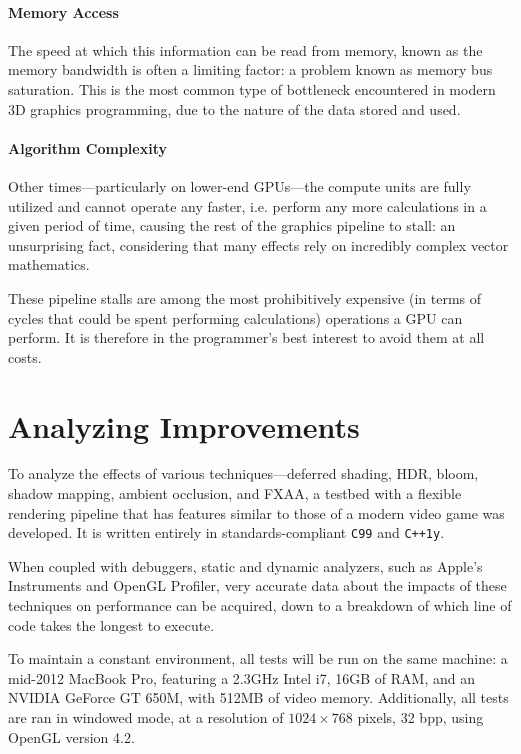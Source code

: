 \documentclass[11pt, oneside]{report}
\begin{document}
\paragraph{Memory Access}
The speed at which this information can be read from memory, known as the \gls{memory bandwidth} is often a limiting factor: a problem known as memory bus saturation. This is the most common type of bottleneck encountered in modern 3D graphics programming, due to the nature of the data stored and used.

\paragraph{Algorithm Complexity}
Other times---particularly on lower-end \glspl{GPU}---the \glspl{compute unit} are fully utilized and cannot operate any faster, i.e. perform any more calculations in a given period of time, causing the rest of the \gls{graphics pipeline} to stall: an unsurprising fact, considering that many effects rely on incredibly complex vector mathematics.

These pipeline stalls are among the most prohibitively expensive (in terms of cycles that could be spent performing calculations) operations a \gls{GPU} can perform. It is therefore in the programmer's best interest to avoid them at all costs.

\section{Analyzing Improvements}
To analyze the effects of various techniques—\gls{deferred shading}, \gls{HDR}, \gls{bloom}, \gls{shadow mapping}, \gls{ambient occlusion}, and \gls{FXAA}, a testbed with a flexible rendering pipeline that has features similar to those of a modern video game was developed. It is written entirely in standards-compliant \texttt{C99} and \texttt{C++1y}.

When coupled with debuggers, static and dynamic analyzers, such as Apple's Instruments and \gls{OpenGL} Profiler, very accurate data about the impacts of these techniques on performance can be acquired, down to a breakdown of which line of code takes the longest to execute.

To maintain a constant environment, all tests will be run on the same machine: a mid-2012 MacBook Pro, featuring a 2.3GHz Intel i7, 16GB of RAM, and an NVIDIA GeForce GT 650M, with 512MB of video memory. Additionally, all tests are ran in windowed mode, at a resolution of $1024 \times 768$ pixels, 32 \gls{bpp}, using \gls{OpenGL} version 4.2.
\end{document}
